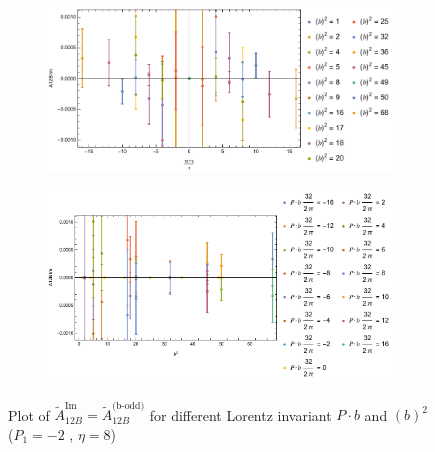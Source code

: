 \documentclass[]{article}
\numberwithin{equation}{section}
\newcommand{\tAmp}{\widetilde{A}}
\newcommand{\tAmp}{\ensuremath{\widetilde{A}^{(+)}}}
\begin{document}
\begin{figure}[h!]
     \centering
     \begin{subfigure}[b]{0.45\textwidth}
         \centering
         \includegraphics[width=\textwidth]{Amp_plots/bP_A12B_b_odd_P1_-2_eta_8.pdf}
     \end{subfigure}
     \begin{subfigure}[b]{0.45\textwidth}
         \centering
         \includegraphics[width=\textwidth]{Amp_plots/bsq_A12B_b_odd_P1_-2_eta_8.pdf}
     \end{subfigure}
        \caption{Plot of $\tAmp^{\text{Im}}_{12B}=\tAmp^{\text{(b-odd)}}_{12B}$ for different Lorentz invariant $P\cdot b$ and $(b)^2$  ($P_{1} = -2$ , $\eta=8$)}
\end{figure}
\end{document}
